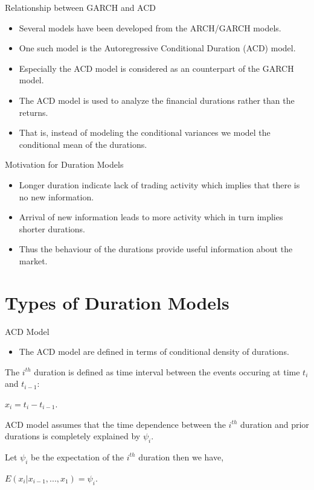 \documentclass[
  ignorenonframetext,
]{beamer}
\providecommand{\tightlist}{%
  \setlength{\itemsep}{0pt}\setlength{\parskip}{0pt}}
\begin{document}
\begin{frame}{Relationship between GARCH and ACD}
\protect\hypertarget{relationship-between-garch-and-acd}{}
\begin{itemize}
\item
  Several models have been developed from the ARCH/GARCH models.
\item
  One such model is the Autoregressive Conditional Duration (ACD) model.
\item
  Especially the ACD model is considered as an counterpart of the GARCH
  model.
\item
  The ACD model is used to analyze the financial durations rather than
  the returns.
\item
  That is, instead of modeling the conditional variances we model the
  conditional mean of the durations.
\end{itemize}
\end{frame}

\begin{frame}{Motivation for Duration Models}
\protect\hypertarget{motivation-for-duration-models}{}
\begin{itemize}
\item
  Longer duration indicate lack of trading activity which implies that
  there is no new information.
\item
  Arrival of new information leads to more activity which in turn
  implies shorter durations.
\item
  Thus the behaviour of the durations provide useful information about
  the market.
\end{itemize}
\end{frame}

\hypertarget{types-of-duration-models}{%
\section{Types of Duration Models}\label{types-of-duration-models}}

\begin{frame}{ACD Model}
\protect\hypertarget{acd-model}{}
\begin{itemize}
\tightlist
\item
  The ACD model are defined in terms of conditional density of
  durations.
\end{itemize}

The \(i^{th}\) duration is defined as time interval between the events
occuring at time \(t_i\) and \(t_{i-1}\):

\(x_i = t_i - t_{i-1}\).

ACD model assumes that the time dependence between the \(i^{th}\)
duration and prior durations is completely explained by \(\psi_i\).

Let \(\psi_i\) be the expectation of the \(i^{th}\) duration then we
have,

\(E(x_i | x_{i-1}, ..., x_1) = \psi_i\).
\end{frame}
\end{document}
